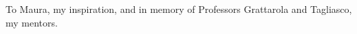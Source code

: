 

\begin{dedication}
To Maura, my inspiration, and in memory of Professors Grattarola and Tagliasco, my mentors.
\end{dedication}




